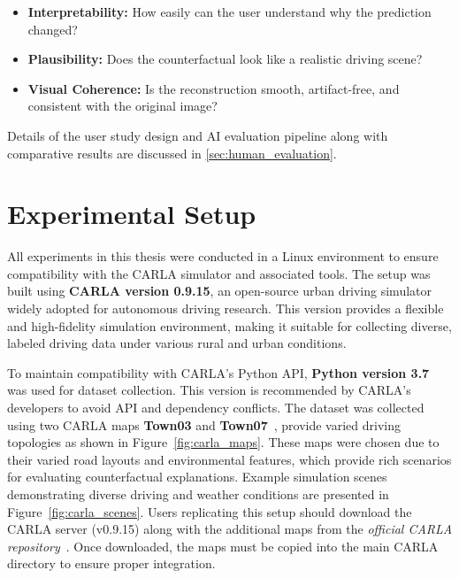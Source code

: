 \begin{itemize}
    \item \textbf{Interpretability:} How easily can the user understand why the prediction changed?
    \item \textbf{Plausibility:} Does the counterfactual look like a realistic driving scene?
    \item \textbf{Visual Coherence:} Is the reconstruction smooth, artifact-free, and consistent with the original image?
\end{itemize}

Details of the user study design and AI evaluation pipeline along with comparative results are discussed in \cref{sec:human_evaluation}.

\section{Experimental Setup}

All experiments in this thesis were conducted in a Linux environment to ensure compatibility with the CARLA simulator and associated tools. The setup was built using \textbf{CARLA version 0.9.15}, an open-source urban driving simulator widely adopted for autonomous driving research. This version provides a flexible and high-fidelity simulation environment, making it suitable for collecting diverse, labeled driving data under various rural and urban conditions.

To maintain compatibility with CARLA’s Python API, \textbf{Python version 3.7} was used for dataset collection. This version is recommended by CARLA’s developers to avoid API and dependency conflicts. The dataset was collected using two CARLA maps \textbf{Town03} and \textbf{Town07}~\cite{CARLA2024}, provide varied driving topologies as shown in Figure~\ref{fig:carla_maps}. These maps were chosen due to their varied road layouts and environmental features, which provide rich scenarios for evaluating counterfactual explanations. Example simulation scenes demonstrating diverse driving and weather conditions are presented in Figure~\ref{fig:carla_scenes}. Users replicating this setup should download the CARLA server (v0.9.15) along with the additional maps from the \textit{official CARLA repository}~\cite{CARLA2024docs}. Once downloaded, the maps must be copied into the main CARLA directory to ensure proper integration.

